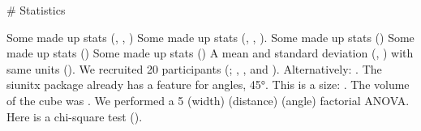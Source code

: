 \newpage
\begin{markdown}

# Statistics

Some made up stats (, , )
Some made up stats (, , ).
Some made up stats ()
Some made up stats ()
Some made up stats ()
A mean and standard deviation (, ) with same units ().
We recruited 20 participants (; , , and ).
Alternatively: .
The siunitx package already has a feature for angles, \ang{45}.
This is a size: .
The volume of the cube was .
We performed a 5 (width) (distance) (angle) factorial ANOVA.
Here is a chi-square test ().



\end{markdown}